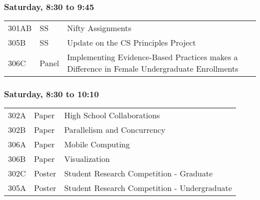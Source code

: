 

\newpage
\subsubsection*{Saturday, 8:30 to 9:45}
\begin{tabular*}{5in}{@{}p{0.5in}@{}p{0.75in}@{}p{3.75in}}

301AB & SS & Nifty Assignments \\

305B & SS & Update on the CS Principles Project \\

306C & Panel & Implementing Evidence-Based Practices makes a Difference in Female Undergraduate Enrollments \\
\end{tabular*}
\subsubsection*{Saturday, 8:30 to 10:10}
\begin{tabular*}{5in}{@{}p{0.5in}@{}p{0.75in}@{}p{3.75in}}

302A & Paper & High School Collaborations \\

302B & Paper & Parallelism and Concurrency \\

306A & Paper & Mobile Computing \\

306B & Paper & Visualization \\

302C & Poster & Student Research Competition - Graduate \\

305A & Poster & Student Research Competition - Undergraduate \\
\end{tabular*}

